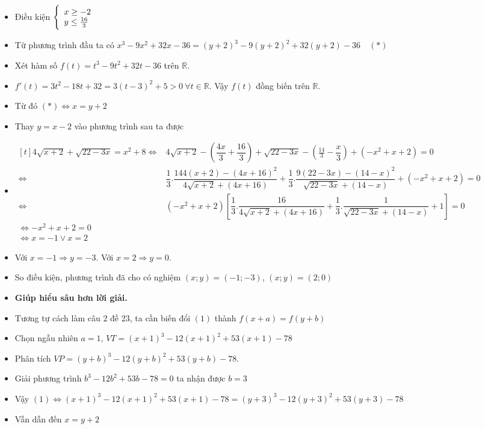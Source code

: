 \lgi 
\begin{itemize}[label=,leftmargin=*]
\item Điều kiện $\left\{\begin{array}{ll}x\ge-2 \\ y\le \frac{16}{3}\end{array}\right.$
\item Từ phương trình đầu ta có $x^3-9x^2+32x-36=(y+2)^3-9(y+2)^2+32(y+2)-36 \quad (*)$
\item Xét hàm số $f(t)=t^3-9t^2+32t-36$ trên $\mathbb{R}$.
\item $f'(t)=3t^2-18t+32=3(t-3)^2+5>0\ \forall t\in \mathbb{R}$. Vậy $f(t)$ đồng biến trên $\mathbb{R}$. 
\item Từ đó $(*)\Leftrightarrow x=y+2$
\item Thay $y=x-2$ vào phương trình sau ta được
\item $\begin{aligned}[t]4\sqrt{x+2}+\sqrt{22-3x}=x^2+8 \Leftrightarrow & 4\sqrt{x+2}-\left(\dfrac{4x}{3}+\dfrac{16}{3} \right) + \sqrt{22-3x}-\left(\frac{14}{3}-\dfrac{x}{3}\right)+(-x^2+x+2)=0 \\
\Leftrightarrow & \dfrac{1}{3}.\dfrac{144(x+2)-(4x+16)^2}{4\sqrt{x+2}+(4x+16)}+\dfrac{1}{3}.\dfrac{9(22-3x)-(14-x)^2}{\sqrt{22-3x}+(14-x)}+(-x^2+x+2)=0 \\
\Leftrightarrow & (-x^2+x+2)\left[\dfrac{1}{3}.\dfrac{16}{4\sqrt{x+2}+(4x+16)}+\dfrac{1}{3}.\dfrac{1}{\sqrt{22-3x}+(14-x)}+1 \right]=0\\
\Leftrightarrow -x^2+x+2=0 \\
\Leftrightarrow x=-1 \vee x=2 \end{aligned}$
\item Với $x=-1 \Rightarrow y=-3$. Với $x=2\Rightarrow y=0$. 
\item So điều kiện, phương trình đã cho có nghiệm $(x;y)=(-1;-3)$, $(x;y)=(2;0)$
\item \textbf{Giúp hiểu sâu hơn lời giải.}
\item Tương tự cách làm câu 2 đề 23, ta cần biến đổi $(1)$ thành $f(x+a)=f(y+b)$
\item Chọn ngẫu nhiên $a=1$, $VT=(x+1)^3-12(x+1)^2+53(x+1)-78$
\item Phân tích $VP=(y+b)^3-12(y+b)^2+53(y+b)-78$.
\item Giải phương trình $b^3-12b^2+53b-78=0$ ta nhận được $b=3$
\item Vậy $(1) \Leftrightarrow (x+1)^3-12(x+1)^2+53(x+1)-78=(y+3)^3-12(y+3)^2+53(y+3)-78$
\item Vẫn dẫn đến $x=y+2$
\end{itemize}

